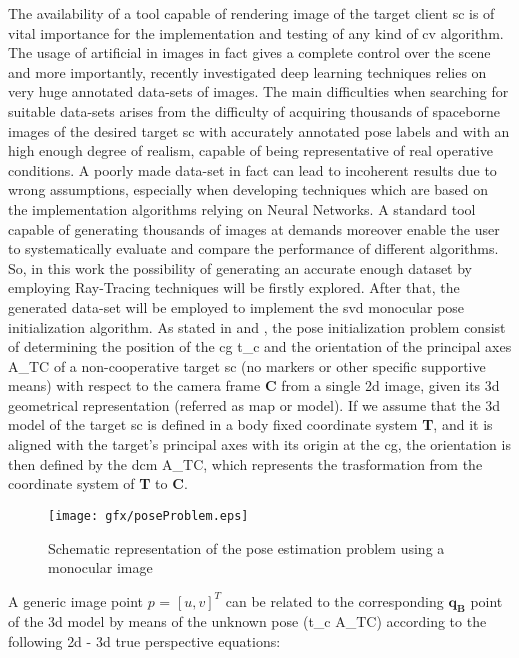 The availability of a tool capable of rendering image of the target client \acrshort{sc} is of vital importance for the implementation and testing of any kind of \acrshort{cv} algorithm.
The usage of artificial in images in fact gives a complete control over the scene and more importantly, recently investigated deep learning techniques relies on very huge annotated data-sets of images. The main difficulties when searching for suitable data-sets arises from the difficulty of acquiring thousands of spaceborne images of the desired target \acrshort{sc} with accurately annotated pose labels and with an high enough degree of realism, capable of being representative of real operative conditions. A poorly made data-set in fact can lead to incoherent results due to wrong assumptions, especially when developing techniques which are based on the implementation algorithms relying on Neural Networks. A standard tool capable of generating thousands of images at demands moreover enable the user to systematically evaluate and compare the performance of different algorithms.
So, in this work the possibility of generating an accurate enough dataset by employing Ray-Tracing techniques will be firstly explored. After that, the generated data-set will be employed to implement the \acrfull{svd} monocular pose initialization algorithm.
As stated in \cite{D2014} and \cite{Sharma2018}, the pose initialization problem consist of determining the position of the \acrfull{cg} \gls{t_c} and the orientation of the principal axes \gls{A_TC} of a non-cooperative target \acrshort{sc} (no markers or other specific supportive means) with respect to the camera frame \textbf{C} from a single \acrfull{2d} image, given its \acrfull{3d} geometrical representation (referred as map or model).
If we assume that the \acrshort{3d} model of the target \acrshort{sc} is defined in a body fixed coordinate system \textbf{T}, and it is aligned with the target's principal axes with its origin at the \acrshort{cg}, the orientation is then defined by the \acrfull{dcm} \gls{A_TC}, which represents the trasformation from the coordinate system of \textbf{T} to \textbf{C}.

\begin{figure}[htbp]
  \centering
  \texttt{[image: gfx/poseProblem.eps]}
  \caption{Schematic representation of the pose estimation problem using a monocular image \cite{Sharma2018}}
\end{figure}

A generic image point $p$ = $ [u,v]^T $ can be related to the corresponding $\mathbf{q_B}$ point of the \acrshort{3d} model by means of the unknown pose (\gls{t_c} \gls{A_TC}) according to the following \acrshort{2d} - \acrshort{3d} true perspective equations:


